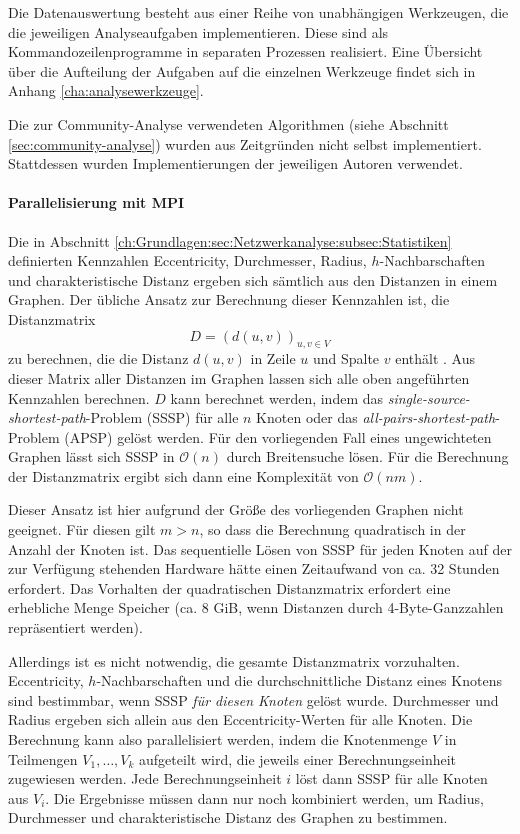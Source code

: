Die Datenauswertung besteht aus einer Reihe von unabhängigen
Werkzeugen, die die jeweiligen Analyseaufgaben implementieren. Diese
sind als Kommandozeilenprogramme in separaten Prozessen
realisiert. Eine Übersicht über die Aufteilung der Aufgaben auf
die einzelnen Werkzeuge findet sich in Anhang
\ref{cha:analysewerkzeuge}.

Die zur Community-Analyse verwendeten Algorithmen (siehe Abschnitt
\ref{sec:community-analyse}) wurden aus Zeitgründen nicht selbst
implementiert. Stattdessen wurden Implementierungen der jeweiligen
Autoren verwendet.

\paragraph{Parallelisierung mit MPI}
\label{sec:parall-mitt-mpi}

Die in Abschnitt
\ref{ch:Grundlagen:sec:Netzwerkanalyse:subsec:Statistiken} definierten
Kennzahlen Eccentricity, Durchmesser, Radius, $h$-Nachbarschaften und
charakteristische Distanz ergeben sich sämtlich aus den Distanzen in
einem Graphen. Der übliche Ansatz zur Berechnung dieser Kennzahlen
ist, die Distanzmatrix
\begin{equation}
  \label{eq:7}
  D = (d(u, v))_{u, v\in V}
\end{equation}
zu berechnen, die die Distanz $d(u, v)$ in Zeile $u$ und Spalte $v$
enthält \cite{Brinkmeier2004}. Aus dieser Matrix aller Distanzen im
Graphen lassen sich alle oben angeführten Kennzahlen berechnen. $D$
kann berechnet werden, indem das
\textit{single-source-shortest-path}-Problem
(SSSP) für alle $n$ Knoten oder das \textit{all-pairs-shortest-path}-Problem
(APSP) gelöst werden. Für den vorliegenden Fall eines
ungewichteten Graphen lässt sich SSSP in $\mathcal{O}(n)$ durch
Breitensuche lösen. Für die Berechnung der Distanzmatrix ergibt
sich dann eine Komplexität von $\mathcal{O}(nm)$.

Dieser Ansatz ist hier aufgrund der Größe des vorliegenden Graphen
nicht geeignet. Für diesen gilt $m > n$, so dass die Berechnung
quadratisch in der Anzahl der Knoten ist. Das sequentielle Lösen von
SSSP für jeden Knoten auf der zur Verfügung stehenden Hardware
hätte einen Zeitaufwand von ca. 32 Stunden erfordert. Das Vorhalten
der quadratischen Distanzmatrix erfordert eine erhebliche Menge
Speicher (ca. 8 GiB, wenn Distanzen durch 4-Byte-Ganzzahlen
repräsentiert werden).

Allerdings ist es nicht notwendig, die gesamte Distanzmatrix
vorzuhalten. Eccentricity, $h$-Nachbarschaften und die
durchschnittliche Distanz eines Knotens sind bestimmbar, wenn SSSP
\emph{für diesen Knoten} gelöst wurde. Durchmesser und Radius
ergeben sich allein aus den Eccentricity-Werten für alle Knoten. Die
Berechnung kann also parallelisiert werden, indem die Knotenmenge $V$
in Teilmengen $V_1, \dots, V_k$ aufgeteilt wird, die jeweils einer
Berechnungseinheit zugewiesen werden. Jede Berechnungseinheit $i$
löst dann SSSP für alle Knoten aus $V_i$. Die Ergebnisse müssen
dann nur noch kombiniert werden, um Radius, Durchmesser und
charakteristische Distanz des Graphen zu bestimmen.

